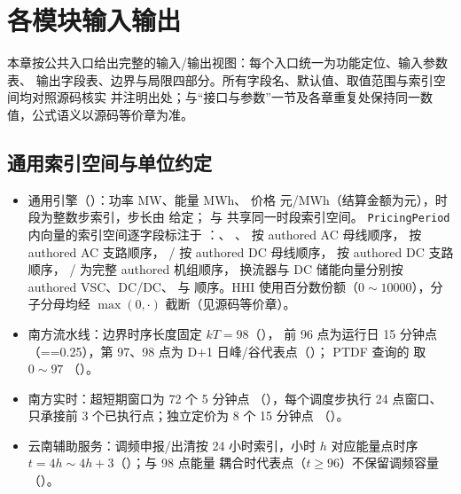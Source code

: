 \section{各模块输入输出}\label{sec:market-module-io}

本章按公共入口给出完整的输入/输出视图：每个入口统一为功能定位、输入参数表、
输出字段表、边界与局限四部分。所有字段名、默认值、取值范围与索引空间均对照源码核实
并注明出处；与“接口与参数”一节及各章重复处保持同一数值，公式语义以源码等价章为准。

\subsection{通用索引空间与单位约定}
\begin{itemize}
  \item 通用引擎（）：功率 MW、能量 MWh、
        价格 元/MWh（结算金额为元），时段为整数步索引，步长由  给定；
         与  共享同一时段索引空间。
        \texttt{PricingPeriod} 内向量的索引空间逐字段标注于
        ：、
        、 按 authored AC 母线顺序，
         按 authored AC 支路顺序，
        / 按 authored DC 母线顺序，
         按 authored DC 支路顺序，
        / 为完整 authored 机组顺序，
        换流器与 DC 储能向量分别按 authored VSC、DC/DC、 与
         顺序。HHI 使用百分数份额（$0\sim10000$），分子分母均经
        $\max(0,\cdot)$ 截断（见源码等价章）。
  \item 南方流水线：边界时序长度固定 $kT=98$（），
        前 96 点为运行日 15 分钟点（==0.25），第 97、98 点为
        D+1 日峰/谷代表点（）；
        PTDF 查询的  取 $0\sim97$
        （）。
  \item 南方实时：超短期窗口为 72 个 5 分钟点
        （），每个调度步执行 24 点窗口、
        只承接前 3 个已执行点；独立定价为 8 个 15 分钟点
        （）。
  \item 云南辅助服务：调频申报/出清按 24 小时索引，小时 $h$ 对应能量点时序
        $t=4h\sim4h+3$（）；与 98 点能量
        耦合时代表点（$t\ge96$）不保留调频容量
        （）。
\end{itemize}

